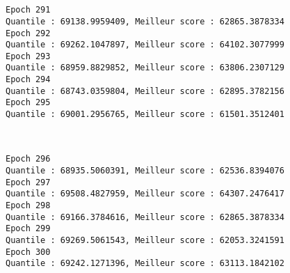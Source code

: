 \documentclass[11pt]{article}
\begin{document}
    \begin{center}
    \end{center}
    { \hspace*{\fill} \\}
    
    \begin{center}
    \end{center}
    { \hspace*{\fill} \\}
    
    \begin{Verbatim}[commandchars=\\\{\}]
Epoch 291
Quantile : 69138.9959409, Meilleur score : 62865.3878334
Epoch 292
Quantile : 69262.1047897, Meilleur score : 64102.3077999
Epoch 293
Quantile : 68959.8829852, Meilleur score : 63806.2307129
Epoch 294
Quantile : 68743.0359804, Meilleur score : 62895.3782156
Epoch 295
Quantile : 69001.2956765, Meilleur score : 61501.3512401

    \end{Verbatim}

    \begin{center}
    \end{center}
    { \hspace*{\fill} \\}
    
    \begin{Verbatim}[commandchars=\\\{\}]
Epoch 296
Quantile : 68935.5060391, Meilleur score : 62536.8394076
Epoch 297
Quantile : 69508.4827959, Meilleur score : 64307.2476417
Epoch 298
Quantile : 69166.3784616, Meilleur score : 62865.3878334
Epoch 299
Quantile : 69269.5061543, Meilleur score : 62053.3241591
Epoch 300
Quantile : 69242.1271396, Meilleur score : 63113.1842102

    \end{Verbatim}

    \begin{center}
    \end{center}
    { \hspace*{\fill} \\}
    
    \begin{center}
    \end{center}
    { \hspace*{\fill} \\}
    
\end{document}
